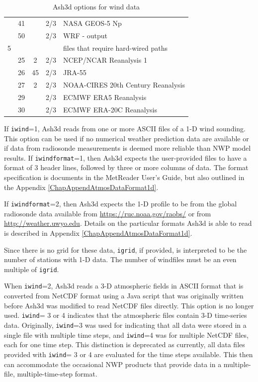 \begin{table}[htbp]
\begin{center}
\begin{tabular}{| c | c| c | c | l |}
 &41&   &2/3&NASA GEOS-5 Np\\
 &50&   &2/3&WRF - output\\
\hline
5& & & &files that require hard-wired paths \\
\hline
 &25&  2&2/3&NCEP/NCAR Reanalysis 1\\
 &26& 45&2/3&JRA-55\\
 &27&  2&2/3&NOAA-CIRES 20th Century Reanalysis\\
 &29&   &2/3&ECMWF ERA5 Reanalysis\\
 &30&   &2/3&ECMWF ERA-20C Reanalysis\\
\hline
\end{tabular}
\caption{\label{tab:MetOptions}Ash3d options for wind data}
\end{center}
\end{table}
\normalsize

If \texttt{iwind}=1, Ash3d reads from one or more ASCII files of a 1-D wind sounding.
This option can be used if no numerical weather prediction
data are available or if data from radiosonde measurements is deemed more
reliable than NWP model results.
If \texttt{iwindformat}=1, then Ash3d expects the user-provided files to have a format
of 3 header lines, followed by three or more columns of data. The format specification
is documents in the MetReader User's Guide, but also outlined in the
Appendix \ref{ChapAppendAtmosDataFormat1d}.

If \texttt{iwindformat}=2, then Ash3d expects the 1-D profile to be from the global
radiosonde data available from \url{https://ruc.noaa.gov/raobs/} or from
\url{http://weather.uwyo.edu}. Details on the particular formats Ash3d is able to
read is described in Appendix \ref{ChapAppendAtmosDataFormat1d}.

Since there is no grid for these data, \texttt{igrid}, if provided, is interpreted to
be the number of stations with 1-D data. The number of windfiles must be an even
multiple of \texttt{igrid}.

When \texttt{iwind}=2, Ash3d reads a 3-D atmospheric fields in ASCII format that is converted from
NetCDF format using a Java script that was originally written before Ash3d was
modified to read NetCDF files directly. This option is no longer used.
\texttt{iwind}= 3 or 4 indicates that the atmospheric files contain 3-D time-series
data. Originally, \texttt{iwind}=3 was used for indicating that all data were stored in
a single file with multiple time steps, and \texttt{iwind}=4 was for multiple NetCDF files,
each for one time step. This distinction is deprecated as currently, all data
files provided with \texttt{iwind}= 3 or 4 are evaluated for the time steps available.
This then can accommodate the occasional NWP products that provide data in a
multiple-file, multiple-time-step format.

